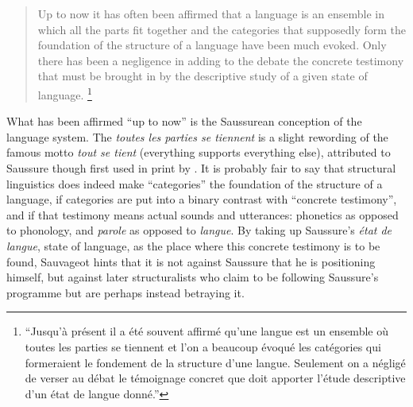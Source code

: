 \documentclass[output=paper]{langscibook}
\begin{document}
\begin{quotation}
Up to now it has often been affirmed that a language is an ensemble in which all the parts fit together and the categories that supposedly form the foundation of the structure of a language have been much evoked. Only there has been a negligence in adding to the debate the concrete testimony that must be brought in by the descriptive study of a given state of language. \citep[7]{Sauvageot1946}\footnote{``Jusqu'à présent il a été souvent affirmé qu'une langue est un ensemble où toutes les parties se tiennent et l'on a beaucoup évoqué les catégories qui formeraient le fondement de la structure d'une langue. Seulement on a négligé de verser au débat le témoignage concret que doit apporter l'étude descriptive d'un état de langue donné.''}
\end{quotation}

What has been affirmed ``up to now'' is the Saussurean conception of the language system. The \emph{toutes les parties se tiennent} is a slight rewording of the famous motto \emph{tout se tient} (everything supports everything else), attributed to Saussure though first used in print by \citet[407]{Meillet1903}. It is probably fair to say that structural linguistics does indeed make ``categories'' the foundation of the structure of a language, if categories are put into a binary contrast with ``concrete testimony'', and if that testimony means actual sounds and utterances: phonetics as opposed to phonology, and \emph{parole} as opposed to \emph{langue}. By taking up Saussure's \emph{état de langue}, state of language, as the place where this concrete testimony is to be found, Sauvageot hints that it is not against Saussure that he is positioning himself, but against later structuralists who claim to be following Saussure's programme but are perhaps instead betraying it.
\end{document}
